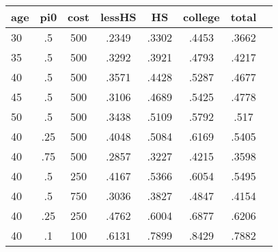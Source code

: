 \begin{table}[htbp]
\begin{tabular}{lccccccc} \hline \hline
 \multicolumn{1}{c}{ age }  & pi0  & cost  & lessHS  & HS  & college  & total  \\  \hline 
       30 &        .5 &       500 &     .2349 &     .3302 &     .4453 &     .3662 \\  
       35 &        .5 &       500 &     .3292 &     .3921 &     .4793 &     .4217 \\  
       40 &        .5 &       500 &     .3571 &     .4428 &     .5287 &     .4677 \\  
       45 &        .5 &       500 &     .3106 &     .4689 &     .5425 &     .4778 \\  
       50 &        .5 &       500 &     .3438 &     .5109 &     .5792 &      .517 \\  
       40 &       .25 &       500 &     .4048 &     .5084 &     .6169 &     .5405 \\  
       40 &       .75 &       500 &     .2857 &     .3227 &     .4215 &     .3598 \\  
       40 &        .5 &       250 &     .4167 &     .5366 &     .6054 &     .5495 \\  
       40 &        .5 &       750 &     .3036 &     .3827 &     .4847 &     .4154 \\  
       40 &       .25 &       250 &     .4762 &     .6004 &     .6877 &     .6206 \\  
       40 &        .1 &       100 &     .6131 &     .7899 &     .8429 &     .7882 \\  
\hline \hline \end{tabular}
\end{table}
